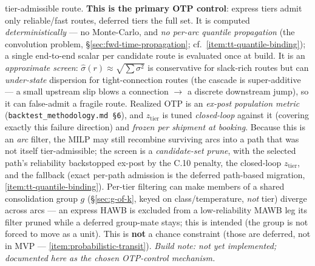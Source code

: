 \documentclass[11pt,a4paper]{article}
\theoremstyle{definition}
\begin{document}
\begin{enumerate}[noitemsep]
        tier-admissible route. \textbf{This is the primary OTP control}: express
        tiers admit only reliable/fast routes, deferred tiers the full set. It is computed \emph{deterministically} --- no Monte-Carlo, and
        \emph{no per-arc quantile propagation} (the convolution problem,
        \S\ref{sec:fwd-time-propagation}; cf.\ \ref{item:tt-quantile-binding}); a
        single end-to-end scalar per candidate route is evaluated once at build.
        It is an \emph{approximate screen}: $\hat\sigma(r) \approx \sqrt{\sum
        \sigma^2}$ is conservative for slack-rich routes but can \emph{under-state}
        dispersion for tight-connection routes (the cascade is super-additive ---
        a small upstream slip blows a connection $\to$ a discrete downstream jump),
        so it can false-admit a fragile route. Realized OTP is an \emph{ex-post
        population metric} (\texttt{backtest\_methodology.md \S6}), and
        $z_{\text{tier}}$ is tuned \emph{closed-loop} against it (covering exactly
        this failure direction) and \emph{frozen per shipment at booking}. Because
        this is an \emph{arc} filter, the MILP may still recombine surviving arcs
        into a path that was not itself tier-admissible; the screen is a
        \emph{candidate-set prune}, with the selected path's reliability backstopped
        ex-post by the C.10 penalty, the closed-loop $z_{\text{tier}}$, and the
        fallback (exact per-path admission is the deferred path-based migration,
        \ref{item:tt-quantile-binding}). Per-tier filtering can make members of a
        shared consolidation group $g$ (\S\ref{sec:g-of-k}, keyed on
        class/temperature, \emph{not} tier) diverge across arcs --- an express HAWB
        is excluded from a low-reliability MAWB leg its filter pruned while a
        deferred group-mate stays; this is intended (the group is not forced to move
        as a unit). This is \textbf{not} a chance constraint (those are deferred,
        not in MVP --- \ref{item:probabilistic-transit}). \emph{Build note: not yet
        implemented; documented here as the chosen OTP-control mechanism.}
\end{enumerate}
\end{document}
